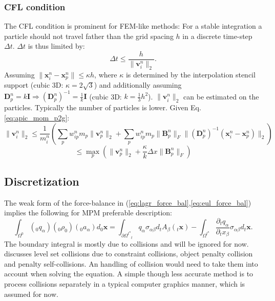 \documentclass[m,times]{cgMA}
\begin{document}
\subsubsection{CFL condition} \label{sec:cfl}
The CFL condition is prominent for FEM-like methods: For a stable integration a particle should not travel father than the grid spacing $h$ in a discrete time-step $\Delta t$. $\Delta t$ is thus limited by:
\begin{equation}
  \Delta t \leq \frac{h}{\|\boldsymbol{v}^n_i\|_2}.
\end{equation}
Assuming $\|\boldsymbol{x}_i^n -\boldsymbol{x}_p^n\| \leq \kappa h$, where $\kappa$ is determined by the interpolation stencil support (cubic 3D: $\kappa = 2\sqrt{3}$) and additionally assuming $\boldsymbol{D}_p^n = k\boldsymbol{I} \Rightarrow (\boldsymbol{D}_p^n)^{-1} = \frac{1}{k}\boldsymbol{I}$ (cubic 3D: $k=\frac{1}{3}h^2$).
$\|\boldsymbol{v}^n_i\|_2$ can be estimated on the particles. Typically the number of particles is lower. Given Eq. \ref{eq:apic_mom_p2g}:
$$
\|\boldsymbol{v}^n_i\|_2 \leq \frac{1}{m_i^n}\left(\sum _ { p } w _ { i p } ^ { n } m _ { p } \| \boldsymbol { v } _ { p } ^ { n } \|_2 + \sum _ { p } w _ { i p } ^ { n } m _ { p } \| \boldsymbol { B } _ { p } ^ { n } \| _ { F } \| ( \boldsymbol { D } _ { p } ^ { n } ) ^ { - 1 } ( \boldsymbol { x } _ { i } ^ { n } - \boldsymbol { x } _ { p } ^ { n } ) \|_2\right)
$$
\begin{equation}
\leq \max _ { p } ( \| \boldsymbol { v } _ { p } ^ { n } \|_2 + \frac { \kappa } { k } \Delta x \| \boldsymbol { B } _ { p } ^ { n } \| _ { F } )
\end{equation}
\cite{MPM:APIC}
\subsection{Discretization}\label{sec:discretization}
The weak form of the force-balance in (\ref{eq:lagr_force_bal},\ref{eq:eul_force_bal}) implies the following for MPM preferable description:
\begin{equation} \label{eq:weak_mpm}
  \int _ { \Omega ^ { 0 } } (_0q _ \alpha) (_0\rho_0) (_0a _\alpha)  d _0\boldsymbol{x}= \int _ { \partial \Omega ^ { t^n } } _tq _ \alpha \sigma _ {\alpha\beta} d_tA_\beta(_t\boldsymbol{x}) -  \int _ { \Omega ^ { t^n} } \frac{\partial _tq _ \alpha}{\partial _tx_\beta} \sigma _ {\alpha\beta} d_t\boldsymbol{x}.
\end{equation}
The boundary integral is mostly due to collisions and will be ignored for now. \cite{MPM:OPTIMI_INTEGR} discusses level set collisions due to constraint collisions, object penalty collision and penalty self-collisions. An handling of collision would need to take them into account when solving the equation. A simple though less accurate method is to process collisions separately in a typical computer graphics manner, which is assumed for now.
\end{document}
